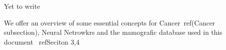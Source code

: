 Yet to write

We offer an overview of some essential concepts for Cancer~ref(Cancer subsection), Neural Netrowkrs and the mamografic database used in this document~ ref{Seciton 3,4}

\begin{comment}
Elaborar el {\it Marco Teórico} consiste en sustentar teóricamente el estudio.
 Ello
implica una revisión bibliográfica del estado del arte, la construcción de una
perspectiva teórica, las técnicas, las investigaciones y antecedentes
relacionados con el problema y que establecen los fundamentos para llevar a
cabo la investigación. \\

La ecuación \ref{eqejem} muestra un ejemplo de {\bf expresión matemática:}


\begin{equation}
 \label{eqejem}
  \begin{array}{c}
    k_1f(x_n, y_n) + k_2\left[ f(x_n, y_n) + \alpha
      hf_x(x_n,y_n) + \beta hf(x_n,y_n)f_y(x_n,y_n) \right] \\
    = f(x_n,y_n) + \frac{h}{2}\left[
      f(x_n,y_n)f_y(x_n,y_n) \right]
  \end{array}
\end{equation}
\end{comment}

